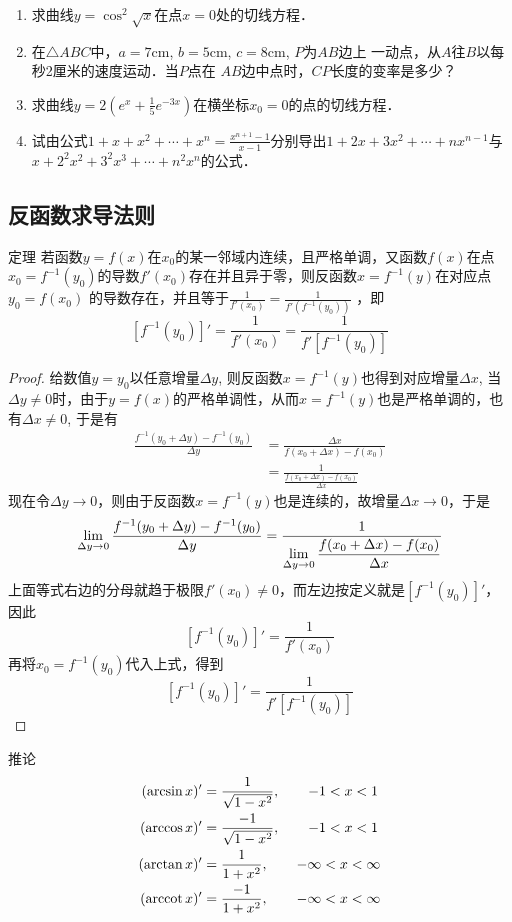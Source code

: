 \begin{ex}
\begin{enumerate}
\item 求曲线$y=\cos^2\sqrt{x}$在点$x=0$处的切线方程．
\item 在$\triangle ABC$中，$a=7$cm, $b=5$cm, $c=8$cm, $P$为$AB$边上
一动点，从$A$往$B$以每秒2厘米的速度运动．当$P$点在
$AB$边中点时，$CP$长度的变率是多少？
\item 求曲线$y=2\left(e^x+\frac{1}{5}e^{-3x}\right)$在横坐标$x_0=0$的点的切线方程．
\item 试由公式$1+x+x^2+\cdots+x^n=\frac{x^{n+1}-1}{x-1}$分别导出$1+2x+3x^2+\cdots+nx^{n-1}$与$x+2^2x^2+3^2x^3+\cdots +n^2x^n$的公式．
\end{enumerate}  
\end{ex}


\subsection{反函数求导法则}

\begin{blk}
    {定理} 若函数$y=f(x)$在$x_0$的某一邻域内连续，且严格单调，又函数$f(x)$在点$x_0=f^{-1}(y_0)$的导数$f'(x_0)$存在并且异于零，则反函数$x=f^{-1}(y)$在对应点$y_0=f(x_0)$
的导数存在，并且等于$\frac{1}{f'(x_0)}=\frac{1}{f'(f^{-1}(y_0))}$
，即
\[[f^{-1}(y_0)]'=\frac{1}{f'(x_0)}=\frac{1}{f'[f^{-1}(y_0)]}\]
\end{blk}

\begin{proof}
给数值$y=y_0$以任意增量$\Delta y$, 则反函数$x=f^{-1}(y)$也得到对应增量$\Delta x$, 当$\Delta y\ne 0$时，由于$y=f(x)$的严格单调性，从而$x=f^{-1}(y)$也是严格单调的，也有$\Delta x\ne 0$, 于是有
\begin{align*}
    \frac{f^{-1}(y_0+\Delta y)-f^{-1}(y_0)}{\Delta y}&=\frac{\Delta x}{f(x_0+\Delta x)-f(x_0)}\\
    &=\frac{1}{\frac{f(x_0+\Delta x)-f(x_0)}{\Delta x}}
\end{align*}
现在令$\Delta y\to 0$，则由于反函数$x=f^{-1}(y)$也是连续的，故增量$\Delta x\to 0$，于是
\[\lim_{\Delta y\to 0}\dfrac{f^{-1}(y_0+\Delta y)-f^{-1}(y_0)}{\Delta y}=\dfrac{1}{\displaystyle\lim_{\Delta y\to 0}\dfrac{f(x_0+\Delta x)-f(x_0)}{\Delta x}}\]
上面等式右边的分母就趋于极限$f'(x_0)\ne 0$，而左边按定义就是$[f^{-1}(y_0)]'$，因此
\[[f^{-1}(y_0)]'=\frac{1}{f'(x_0)}\]
再将$x_0=f^{-1}(y_0)$代入上式，得到
\[[f^{-1}(y_0)]'=\frac{1}{f'[f^{-1}(y_0)]}\]
\end{proof}

\begin{blk}{推论}
\begin{align*}
    (\arcsin x)'&=\dfrac{1}{\sqrt{1-x^2}},\qquad -1<x<1\\
    (\arccos x)'&=\dfrac{-1}{\sqrt{1-x^2}},\qquad -1<x<1\\
    (\arctan x)'&=\dfrac{1}{{1+x^2}},\qquad -\infty<x<\infty\\
    (\operatorname{arccot} x)'&=\dfrac{-1}{{1+x^2}},\qquad -\infty<x<\infty\\
\end{align*}
\end{blk}

